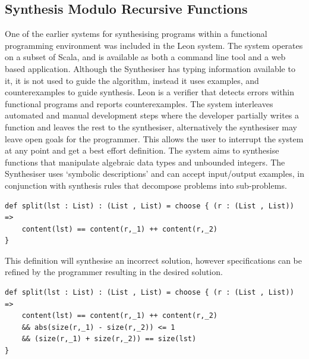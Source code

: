 \documentclass[a4paper]{article}
\begin{document}
\subsection{Synthesis Modulo Recursive Functions}
\label{sec:org345b69c}
One of the earlier systems for synthesising programs within a functional
programming environment was included in the Leon system. The system 
operates on a subset of Scala, and is available as both a command line
tool and a web based application. Although the Synthesiser has typing 
information available to it, it is not used to guide the algorithm, 
instead it uses examples, and counterexamples to guide synthesis.
Leon is a verifier that detects errors within functional programs and 
reports counterexamples. The system interleaves automated and manual 
development steps where the developer partially writes a function and 
leaves the rest to the synthesiser, alternatively the synthesiser may 
leave open goals for the programmer. This allows the user to interrupt 
the system at any point and get a best effort definition. The system 
aims to synthesise functions that manipulate algebraic data types and 
unbounded integers. The Synthesiser uses `symbolic descriptions' and
can accept input/output examples, in conjunction with synthesis rules
that decompose problems into sub-problems. 

\begin{center}
\begin{verbatim}
def split(lst : List) : (List , List) = choose { (r : (List , List)) => 
	content(lst) == content(r,_1) ++ content(r,_2)
}
\end{verbatim}
\end{center}

This definition will synthesise an incorrect solution, however 
specifications can be refined by the programmer resulting in the 
desired solution.

\begin{center}
\begin{verbatim}
def split(lst : List) : (List , List) = choose { (r : (List , List)) => 
	content(lst) == content(r,_1) ++ content(r,_2)
	&& abs(size(r,_1) - size(r,_2)) <= 1
	&& (size(r,_1) + size(r,_2)) == size(lst)
}
\end{verbatim}
\end{center}
\end{document}
